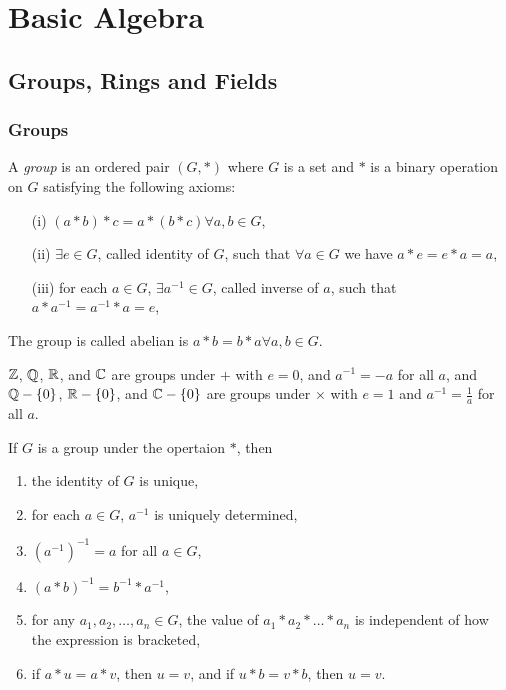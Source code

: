 \chapter{Basic Algebra}
\label{chap:basics}

\section{Groups, Rings and Fields}

\subsection{Groups}

\begin{definition}
  A \textit{group} is an ordered pair $(G,\ast)$ where $G$ is a set and $\ast$ is a binary
  operation on $G$ satisfying the following axioms:

  \begin{itemize}
    \item[(i)] $(a\ast b)\ast c=a\ast(b\ast c)\forall a,b\in G$,
    \item[(ii)] $\exists e\in G$, called identity of $G$, such that $\forall a\in G$ we have 
      $a\ast e=e\ast a=a$,
    \item[(iii)] for each $a\in G$, $\exists a^{-1}\in G$, called inverse of $a$, such that 
      $a\ast a^{-1}=a^{-1}\ast a=e$,
  \end{itemize}

  The group is called abelian is $a\ast b=b\ast a\forall a,b\in G$. \cite{dummit}
\end{definition}

\begin{ex}
  $\mathbb{Z}$, $\mathbb{Q}$, $\mathbb{R}$, and $\mathbb{C}$ are groups under $+$ with $e=0$, and $a^{-1}=-a$ for all $a$, and
  $\mathbb{Q}-\{0\}$, $\mathbb{R}-\{0\}$, and $\mathbb{C}-\{0\}$ are groups under $\times$ with $e=1$ and
  $a^{-1}=\frac{1}{a}$ for all $a$.
\end{ex}

\begin{remark}
  If $G$ is a group under the opertaion $\ast$, then

  \begin{enumerate}
    \item the identity of $G$ is unique,
    \item for each $a\in G$, $a^{-1}$ is uniquely determined,
    \item $(a^{-1})^{-1}=a$ for all $a\in G$,
    \item $(a\ast b)^{-1}=b^{-1}\ast a^{-1}$,
    \item for any $a_1,a_2,\ldots,a_n\in G$, the value of $a_1\ast a_2\ast\ldots\ast a_n$ is
        independent of how the expression is bracketed,
    \item if $a\ast u=a\ast v$, then $u=v$, and if $u\ast b=v\ast b$, then $u=v$.
  \end{enumerate}

\end{remark}

